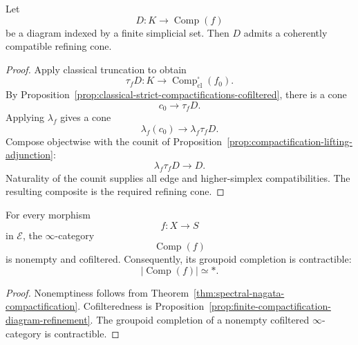 \begin{proposition}
\label{prop:finite-compactification-diagram-refinement}
Let
\[
    D:K\longrightarrow\operatorname{Comp}(f)
\]
be a diagram indexed by a finite simplicial set.  Then \(D\) admits a
coherently compatible refining cone.
\end{proposition}

\begin{proof}
Apply classical truncation to obtain
\[
    \tau_fD:
    K\longrightarrow
    \operatorname{Comp}^{\square}_{\mathrm{cl}}(f_0).
\]
By Proposition~\ref{prop:classical-strict-compactifications-cofiltered},
there is a cone
\[
    c_0\longrightarrow\tau_fD.
\]
Applying \(\lambda_f\) gives a cone
\[
    \lambda_f(c_0)
    \longrightarrow
    \lambda_f\tau_fD.
\]
Compose objectwise with the counit of
Proposition~\ref{prop:compactification-lifting-adjunction}:
\[
    \lambda_f\tau_fD
    \longrightarrow
    D.
\]
Naturality of the counit supplies all edge and higher-simplex
compatibilities.  The resulting composite is the required refining cone.
\end{proof}

\begin{theorem}
\label{thm:compactification-category-contractible}
For every morphism
\[
    f:X\longrightarrow S
\]
in \(\mathcal E\), the \(\infty\)-category
\[
    \operatorname{Comp}(f)
\]
is nonempty and cofiltered.  Consequently, its groupoid completion is
contractible:
\[
    \bigl|
      \operatorname{Comp}(f)
    \bigr|
    \simeq
    *.
\]
\end{theorem}

\begin{proof}
Nonemptiness follows from
Theorem~\ref{thm:spectral-nagata-compactification}.  Cofilteredness is
Proposition~\ref{prop:finite-compactification-diagram-refinement}.  The
groupoid completion of a nonempty cofiltered \(\infty\)-category is
contractible.
\end{proof}

